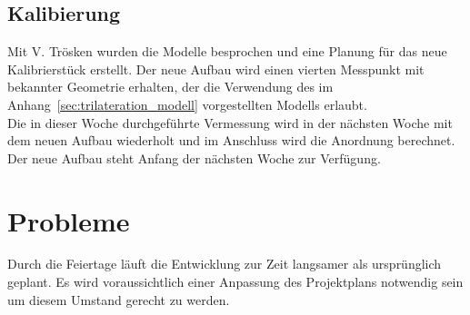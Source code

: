 \documentclass[a4paper,12pt,fleqn]{article}
\begin{document}
\subsection{Kalibierung}
Mit V. Trösken wurden die Modelle besprochen und eine Planung für das neue Kalibrierstück erstellt. Der neue Aufbau wird einen vierten Messpunkt mit bekannter Geometrie erhalten, der die Verwendung des im Anhang~\ref{sec:trilateration_modell} vorgestellten Modells erlaubt.\\
Die in dieser Woche durchgeführte Vermessung wird in der nächsten Woche mit dem neuen Aufbau wiederholt und im Anschluss wird die Anordnung berechnet.\\
Der neue Aufbau steht Anfang der nächsten Woche zur Verfügung.

\section[Probleme]{Probleme}
Durch die Feiertage läuft die Entwicklung zur Zeit langsamer als ursprünglich geplant. Es wird voraussichtlich einer Anpassung des Projektplans notwendig sein um diesem Umstand gerecht zu werden.



\newpage


\end{document}
